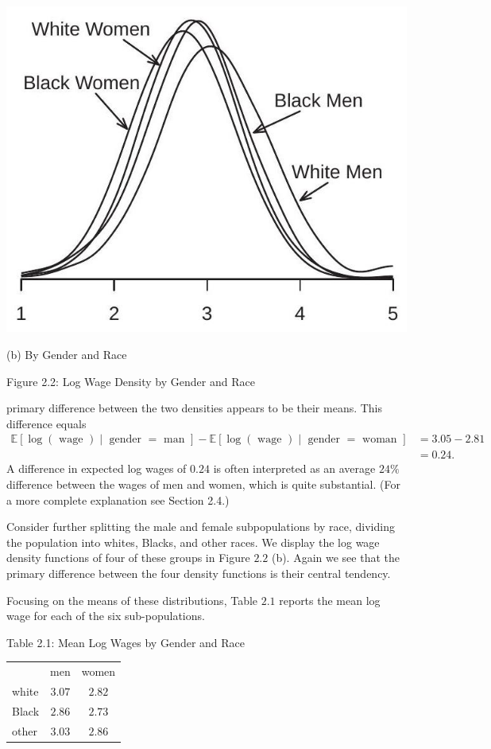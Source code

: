 \documentclass[10pt]{article}
\begin{document}
\includegraphics[max width=\textwidth]{2022_09_17_efa0deee3441d06e0b66g-04(1)}

(b) By Gender and Race

Figure 2.2: Log Wage Density by Gender and Race

primary difference between the two densities appears to be their means. This difference equals
$$
\begin{aligned}
\mathbb{E}[\log (\text { wage }) \mid \text { gender }=\text { man }]-\mathbb{E}[\log (\text { wage }) \mid \text { gender }=\text { woman }] &=3.05-2.81 \\
&=0.24 .
\end{aligned}
$$
A difference in expected log wages of $0.24$ is often interpreted as an average $24 \%$ difference between the wages of men and women, which is quite substantial. (For a more complete explanation see Section 2.4.)

Consider further splitting the male and female subpopulations by race, dividing the population into whites, Blacks, and other races. We display the log wage density functions of four of these groups in Figure $2.2$ (b). Again we see that the primary difference between the four density functions is their central tendency.

Focusing on the means of these distributions, Table $2.1$ reports the mean log wage for each of the six sub-populations.

Table 2.1: Mean Log Wages by Gender and Race

\begin{tabular}{lcc}
\hline\hline
 & men & women \\
\cline { 2 - 3 }
white & $3.07$ & $2.82$ \\
Black & $2.86$ & $2.73$ \\
other & $3.03$ & $2.86$ \\
\hline
\end{tabular}
\end{document}
